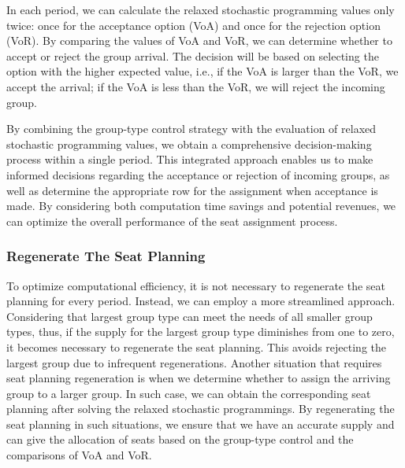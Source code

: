 In each period, we can calculate the relaxed stochastic programming values only twice: once for the acceptance option (VoA) and once for the rejection option (VoR). By comparing the values of VoA and VoR, we can determine whether to accept or reject the group arrival. The decision will be based on selecting the option with the higher expected value, i.e., if the VoA is larger than the VoR, we accept the arrival; if the VoA is less than the VoR, we will reject the incoming group.



By combining the group-type control strategy with the evaluation of relaxed stochastic programming values, we obtain a comprehensive decision-making process within a single period. This integrated approach enables us to make informed decisions regarding the acceptance or rejection of incoming groups, as well as determine the appropriate row for the assignment when acceptance is made. By considering both computation time savings and potential revenues, we can optimize the overall performance of the seat assignment process.


\subsubsection{Regenerate The Seat Planning}
To optimize computational efficiency, it is not necessary to regenerate the seat planning for every period. Instead, we can employ a more streamlined approach. Considering that largest group type can meet the needs of all smaller group types, thus, if the supply for the largest group type diminishes from one to zero, it becomes necessary to regenerate the seat planning. This avoids rejecting the largest group due to infrequent regenerations. Another situation that requires seat planning regeneration is when we determine whether to assign the arriving group to a larger group. In such case, we can obtain the corresponding seat planning after solving the relaxed stochastic programmings. By regenerating the seat planning in such situations, we ensure that we have an accurate supply and can give the allocation of seats based on the group-type control and the comparisons of VoA and VoR.


